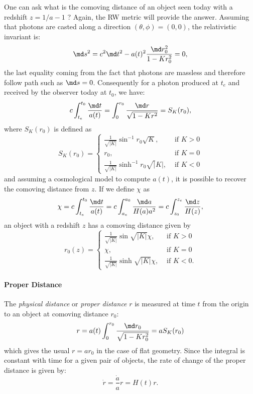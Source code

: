 One can ask what is the comoving distance of an object seen today with a redshift $z=1/a-1$ ? Again, the RW metric will provide the answer. Assuming that photons are casted along a direction $(\theta,\phi)=(0,0)$, the relativistic invariant is:
\begin{equation}
	\md s^2=c^2\md t^2-a(t)^2\frac{\md r_0^2}{1-Kr_0^2}=0,
\end{equation} 
the last equality coming from the fact that photons are massless and therefore follow path such as $\md s=0$. Consequently for a photon produced at $t_e$ and received by the observer today at $t_0$, we have:
\begin{equation}
	c\int_{t_e}^{t_0}\frac{\md t}{a(t)}=\int_0^{r_0} \frac{\md r}{\sqrt{1-Kr^2}}=S_K(r_0),
\end{equation}
where $S_K(r_0)$ is defined as 
\begin{equation}
	S_K(r_0)=
	\begin{cases}
	\frac{1}{\sqrt {|K|}}	\sin^{-1}{r_0\sqrt K}, &\text{ if } K>0\\
	r_0, &\text{ if } K=0\\
	\frac{1}{\sqrt {|K|}}	\sinh^{-1}{r_0\sqrt |K| }, &\text{ if } K<0
	\end{cases}
\end{equation}
and assuming a cosmological model to compute $a(t)$, it is possible to recover the comoving distance from $z$. If we define $\chi$ as
\begin{equation}
	\chi=c\int_{t_e}^{t_0}\frac{\md t}{a(t)}=c\int_{a_e}^{a_0}\frac{\md a}{H(a)a^2}=c\int_{z_0}^{z_e}\frac{\md z}{H(z)},
\end{equation}
an object with a redshift $z$ has a comoving distance given by
\begin{equation}
	r_0(z)=
	\begin{cases}
		\frac{1}{\sqrt{|K|}}\sin{\sqrt{|K|}\chi}, &\text{ if } K>0\\
		\chi, &\text{ if } K=0\\
		\frac{1}{\sqrt{|K|}}\sinh{\sqrt{|K|}\chi}, &\text{ if } K<0.
	\end{cases}
	\label{eq:comovz}
\end{equation}

\paragraph{Proper Distance} %
\label{par:proper_distance}
The \emph{physical distance} or \emph{proper distance} $r$ is measured at time $t$ from the origin to an object at comoving distance $r_0$:
\begin{equation}
	r=a(t)\int_0^{r_0}\frac{\md r_0}{\sqrt{1-Kr_0^2}}=aS_K(r_0)
\end{equation}
which gives the usual $r=a r_0$ in the case of flat geometry. Since the integral is constant with time for a given pair of objects, the rate of change of the proper distance is given by:
\begin{equation}
	\dot r=\frac{\dot a}{a}r=H(t)r.
\end{equation}

